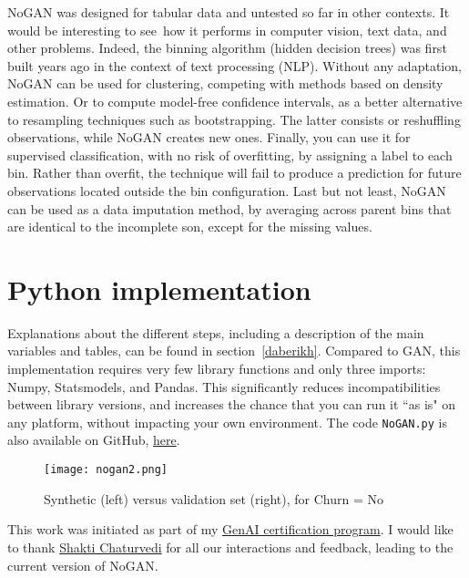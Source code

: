 \documentclass[oneside,10pt]{book}
\begin{document}
NoGAN was designed for tabular data and untested so far in other contexts. It would be interesting to see~how it performs in computer vision, text data, and
 other problems. Indeed, the binning algorithm (hidden decision trees) was first built years ago in the context 
 of text processing (NLP).  Without any adaptation, NoGAN can be used for clustering, competing with methods based on density estimation. Or to compute
 model-free confidence intervals, as a better alternative to \textcolor{index}{resampling} techniques such as 
 \textcolor{index}{bootstrapping}. The latter consists or reshuffling observations, while NoGAN creates new ones.
 Finally, you can use it for supervised classification, with no risk of overfitting, by assigning a label to each bin. Rather than overfit, the technique
 will fail to produce a prediction for future observations located outside the bin configuration. Last but not least, NoGAN can be used as a data imputation method, by averaging across parent bins that are identical to the incomplete son, except for the missing values.



\section{Python implementation}\label{gomornogan}

Explanations about the different steps, including a description of the main variables and tables, can be found in section~\ref{daberikh}.
Compared to GAN, this implementation requires very few library functions and only three imports: Numpy, Statsmodels, and Pandas. This significantly reduces
 incompatibilities between library versions, and increases the chance that you can run it ``as is" on any platform, without
 impacting your own environment. The code \texttt{NoGAN.py} is also available on GitHub, \href{https://github.com/VincentGranville/Main/blob/main/NoGAN.py}{here}. 

\begin{figure}[H]
\centering
\texttt{[image: nogan2.png]} %
\caption{Synthetic (left) versus validation set (right), for Churn = No}
\label{fig:nogan2}
\end{figure}

This work was initiated as part of my \href{https://mltblog.com/3pWxvZK}{GenAI certification program}. I would like to thank 
\href{https://www.linkedin.com/in/shakti-chaturvedi-49aab9106/}{Shakti Chaturvedi} for all our interactions and feedback, leading to the current version of NoGAN.
\vspace{1ex}
\end{document}
